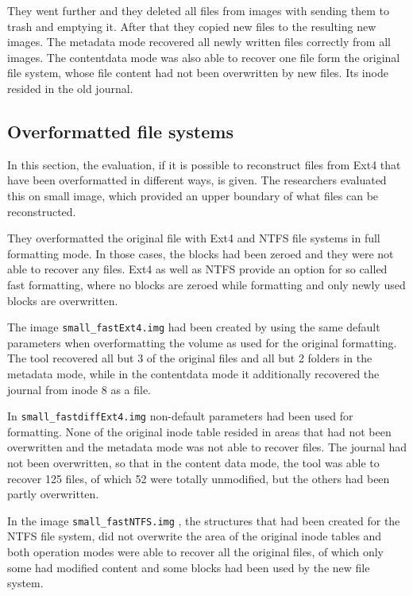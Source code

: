 \documentclass{acm_proc_article-sp}
\begin{document}
They went further and they deleted all files from images with sending them to trash and emptying it. After that they copied new files to the resulting new images. The metadata mode recovered all newly written files correctly from all images. The contentdata mode was also able to recover one file form the original file system, whose file content had not been overwritten by new files. Its inode resided in the old journal.


\subsection{Overformatted file systems}

In this section, the evaluation, if it is possible to reconstruct files from Ext4 that have been overformatted in different ways, is given. The researchers evaluated this on small image, which provided an upper boundary of what files can be reconstructed.

They overformatted the original file with Ext4 and NTFS file systems in full formatting mode. In those cases, the blocks had been zeroed and they were not able to recover any files. Ext4 as well as NTFS provide an option for so called fast formatting, where no blocks are zeroed while formatting and only newly used blocks are overwritten.

The image \texttt{small\_fastExt4.img} 
 had been created by using the same default parameters when overformatting the volume as used for the original formatting. The tool recovered all but 3 of the original files and all but 2 folders in the metadata mode, while in the contentdata mode it additionally recovered the journal from inode 8 as a file.

In \texttt{small\_fastdiffExt4.img} non-default parameters had been used 
 for formatting. None of the original inode table resided in areas that had not been overwritten and the metadata mode was not able to recover files. The journal had not been overwritten, so that in the content data mode, the tool was able to recover 125 files, of which 52 were totally unmodified, but the others had been partly overwritten.

In the image 
\texttt{small\_fastNTFS.img}
, the structures that had been created for the NTFS file system, did not overwrite the area of the original inode tables and both operation modes were able to recover all the original files, of which only some had modified content and some blocks had been used by the new file system.
\end{document}
